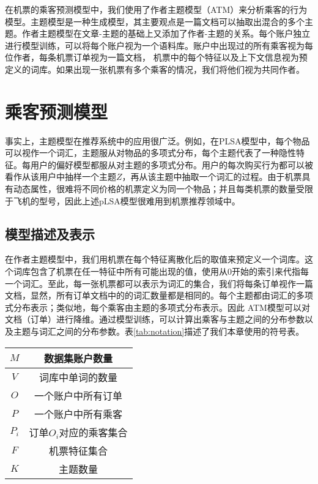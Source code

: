 在机票的乘客预测模型中，我们使用了作者主题模型（ATM）\parencite{rosen2004author,steyvers2004probabilistic,rosen2010learning}来分析乘客的行为模型。主题模型是一种生成模型，其主要观点是一篇文档可以抽取出混合的多个主题。作者主题模型在文章-主题的基础上又添加了作者-主题的关系。每个账户独立进行模型训练，可以将每个账户视为一个语料库。账户中出现过的所有乘客视为每位作者，每条机票订单视为一篇文档， 机票中的每个特征以及上下文信息视为预定义的词库。如果出现一张机票有多个乘客的情况，我们将他们视为共同作者。

\section{乘客预测模型}
事实上，主题模型在推荐系统中的应用很广泛。例如，在PLSA模型中，每个物品可以视作一个词汇，主题服从对物品的多项式分布，每个主题代表了一种隐性特征。每用户的偏好模型都服从对主题的多项式分布。用户的每次购买行为都可以被看作从该用户中抽样一个主题$Z$，再从该主题中抽取一个词汇的过程。由于机票具有动态属性，很难将不同价格的机票定义为同一个物品；并且每类机票的数量受限于飞机的型号，因此上述pLSA模型很难用到机票推荐领域中。

\subsection{模型描述及表示}

在作者主题模型中，我们用机票在每个特征离散化后的取值来预定义一个词库。这个词库包含了机票在任一特征中所有可能出现的值，使用从0开始的索引来代指每一个词汇。至此，每一张机票都可以表示为词汇的集合，我们将每条订单视作一篇文档，显然，所有订单文档中的的词汇数量都是相同的。每个主题都由词汇的多项式分布表示；类似地，每个乘客由主题的多项式分布表示。因此
ATM模型可以对文档（订单）进行降维。通过模型训练，可以计算出乘客与主题之间的分布参数以及主题与词汇之间的分布参数。表\ref{tab:notation}描述了我们本章使用的符号表。

\begin{table}[!hpb]
\centering
\begin{tabular}{|c|c|} \hline
$M$ & 数据集账户数量\\ \hline
$V$ & 词库中单词的数量\\ \hline
$O$ & 一个账户中所有订单\\ \hline
$P$ & 一个账户中所有乘客\\ \hline
$P_i$ & 订单$O_i$对应的乘客集合 \\ \hline
$F$ & 机票特征集合\\ \hline
$K$ & 主题数量\\ \hline
\end{tabular}
\end{table}

